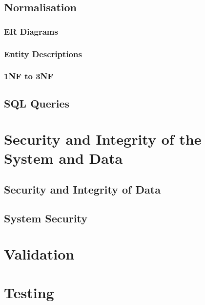 \subsection{Normalisation}

\subsubsection{ER Diagrams}

\subsubsection{Entity Descriptions}

\subsubsection{1NF to 3NF}

\subsection{SQL Queries}

\section{Security and Integrity of the System and Data}

\subsection{Security and Integrity of Data}

\subsection{System Security}

\section{Validation}

\section{Testing}

